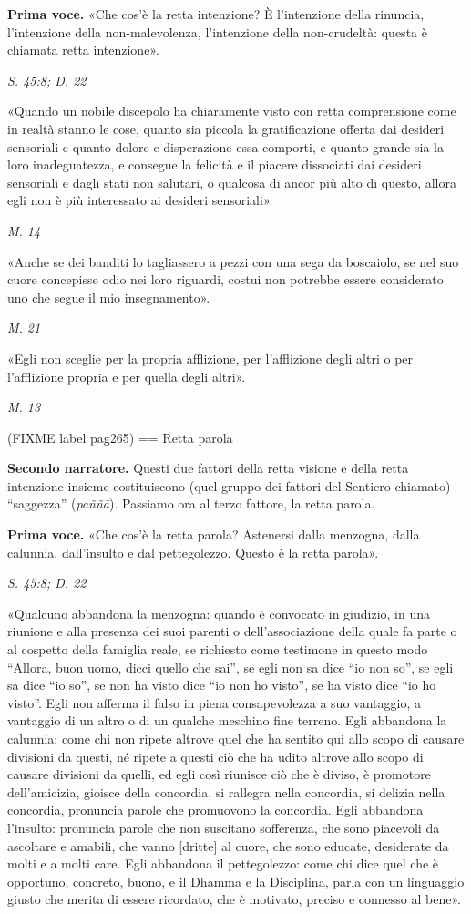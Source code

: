\textbf{Prima voce.} «Che cos’è la retta intenzione? È l’intenzione della
rinuncia, l’intenzione della non-malevolenza, l’intenzione della
non-crudeltà: questa è chiamata retta intenzione».


\emph{S. 45:8; D. 22}


«Quando un nobile discepolo ha chiaramente visto con retta comprensione
come in realtà stanno le cose, quanto sia piccola la gratificazione
offerta dai desideri sensoriali e quanto dolore e disperazione essa
comporti, e quanto grande sia la loro inadeguatezza, e consegue la
felicità e il piacere dissociati dai desideri sensoriali e dagli stati
non salutari, o qualcosa di ancor più alto di questo, allora egli non è
più interessato ai desideri sensoriali».


\emph{M. 14}


«Anche se dei banditi lo tagliassero a pezzi con una sega da boscaiolo,
se nel suo cuore concepisse odio nei loro riguardi, costui non potrebbe
essere considerato uno che segue il mio insegnamento».


\emph{M. 21}


«Egli non sceglie per la propria afflizione, per l’afflizione degli
altri o per l’afflizione propria e per quella degli altri».


\emph{M. 13}


(FIXME label pag265)
== Retta parola


\textbf{Secondo narratore.} Questi due fattori della retta visione e della retta
intenzione insieme costituiscono (quel gruppo dei fattori del Sentiero
chiamato) “saggezza” (\emph{paññā}). Passiamo ora al terzo fattore, la retta
parola.


\textbf{Prima voce.} «Che cos’è la retta parola? Astenersi dalla menzogna, dalla
calunnia, dall’insulto e dal pettegolezzo. Questo è la retta parola».


\emph{S. 45:8; D. 22}


«Qualcuno abbandona la menzogna: quando è convocato in giudizio, in una
riunione e alla presenza dei suoi parenti o dell’associazione della
quale fa parte o al cospetto della famiglia reale, se richiesto come
testimone in questo modo “Allora, buon uomo, dicci quello che sai”, se
egli non sa dice “io non so”, se egli sa dice “io so”, se non ha visto
dice “io non ho visto”, se ha visto dice “io ho visto”. Egli non afferma
il falso in piena consapevolezza a suo vantaggio, a vantaggio di un
altro o di un qualche meschino fine terreno. Egli abbandona la calunnia:
come chi non ripete altrove quel che ha sentito qui allo scopo di
causare divisioni da questi, né ripete a questi ciò che ha udito altrove
allo scopo di causare divisioni da quelli, ed egli così riunisce ciò che
è diviso, è promotore dell’amicizia, gioisce della concordia, si
rallegra nella concordia, si delizia nella concordia, pronuncia parole
che promuovono la concordia. Egli abbandona l’insulto: pronuncia parole
che non suscitano sofferenza, che sono piacevoli da ascoltare e amabili,
che vanno [dritte] al cuore, che sono educate, desiderate da molti e a
molti care. Egli abbandona il pettegolezzo: come chi dice quel che è
opportuno, concreto, buono, e il Dhamma e la Disciplina, parla con un
linguaggio giusto che merita di essere ricordato, che è motivato,
preciso e connesso al bene».



